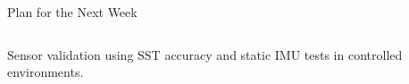 \begin{frame}{Plan for the Next Week}
    \begin{columns}[T]
        \begin{column}{0.5\textwidth}
            \centering
        \end{column}
        \begin{column}{0.5\textwidth}
            \centering
        \end{column}
    \end{columns}
    \vspace{1em}
    \begin{center}
        \small Sensor validation using SST accuracy and static IMU tests in controlled environments.
    \end{center}
\end{frame}